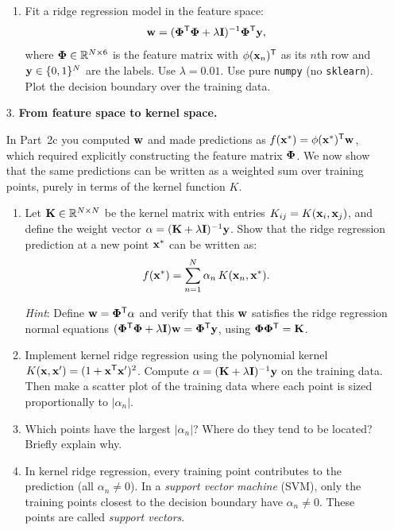 \documentclass[submit]{../harvardml}
\begin{document}
\begin{problem}
\begin{enumerate}
\begin{enumerate}
    \item Fit a ridge regression model in the feature space:
    \[
      \boldw = (\bPhi^\trans \bPhi + \lambda \ident)^{-1} \bPhi^\trans \boldy,
    \]
    where $\bPhi \in \reals^{N \times 6}$ is the feature matrix with
    $\bphi(\boldx_n)^\trans$ as its $n$th row and $\boldy \in \{0, 1\}^N$
    are the labels. Use $\lambda = 0.01$. Use pure \texttt{numpy} (no \texttt{sklearn}).
    Plot the decision boundary over the training data.
  \end{enumerate}

  \item[3.] \textbf{From feature space to kernel space.}

  In Part~2c you computed $\mathbf{w}$ and made predictions as
  $f(\mathbf{x}^*) = \mathbf{\phi}(\mathbf{x}^*)^{\mathsf{T}} \mathbf{w}$, which required
  explicitly constructing the feature matrix $\mathbf{\Phi}$. We now show that
  the same predictions can be written as a weighted sum over training
  points, purely in terms of the kernel function $K$.

  \begin{enumerate}
    \item Let $\mathbf{K} \in \mathbb{R}^{N \times N}$ be the kernel matrix
    with entries $K_{ij} = K(\mathbf{x}_i, \mathbf{x}_j)$, and define
    the weight vector
    $\mathbf{\alpha} = (\mathbf{K} + \lambda \mathbf{I})^{-1} \mathbf{y}$.
    Show that the ridge regression prediction at a new point $\mathbf{x}^*$
    can be written as:
    \[
      f(\mathbf{x}^*) = \sum_{n=1}^{N} \alpha_n \, K(\mathbf{x}_n, \mathbf{x}^*).
    \]

    \textit{Hint}: Define $\mathbf{w} = \mathbf{\Phi}^{\mathsf{T}} \mathbf{\alpha}$ and verify
    that this $\mathbf{w}$ satisfies the ridge regression normal equations
    $(\mathbf{\Phi}^{\mathsf{T}} \mathbf{\Phi} + \lambda \mathbf{I})\mathbf{w} = \mathbf{\Phi}^{\mathsf{T}} \mathbf{y}$,
    using $\mathbf{\Phi} \mathbf{\Phi}^{\mathsf{T}} = \mathbf{K}$.

    \item Implement kernel ridge regression using the polynomial kernel
    $K(\mathbf{x}, \mathbf{x}') = (1 + \mathbf{x}^{\mathsf{T}} \mathbf{x}')^2$. Compute
    $\mathbf{\alpha} = (\mathbf{K} + \lambda \mathbf{I})^{-1} \mathbf{y}$ on the
    training data. Then make a scatter plot of the training data where
    each point is sized proportionally to $|\alpha_n|$.

    \item Which points have the largest $|\alpha_n|$? Where do they tend
    to be located? Briefly explain why.

    \item In kernel ridge regression, every training point contributes to
    the prediction (all $\alpha_n \neq 0$). In a \emph{support vector
    machine} (SVM), only the training points closest to the decision
    boundary have $\alpha_n \neq 0$. These points are called
    \emph{support vectors}.


\end{enumerate}
\end{enumerate}
\end{problem}
\end{document}

